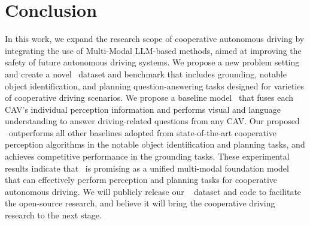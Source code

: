 \section{Conclusion}
In this work, we expand the research scope of cooperative autonomous driving by integrating the use of Multi-Modal LLM-based methods, aimed at improving the safety of future autonomous driving systems. We propose a new problem setting and create a novel \namedataset~dataset and benchmark that includes grounding, notable object identification, and planning question-answering tasks designed for varieties of cooperative driving scenarios. We propose a baseline model \namemethod~that fuses each CAV's individual perception information and performs visual and language understanding to answer driving-related questions from any CAV. 
Our proposed \namemethod~outperforms all other baselines adopted from state-of-the-art cooperative perception algorithms in the notable object identification and planning tasks, and achieves competitive performance in the grounding tasks. 
These experimental results indicate that \namemethod~is promising as a unified multi-modal foundation model that can effectively perform perception and planning tasks for cooperative autonomous driving.
We will publicly release our \namedataset~ dataset and code to facilitate the open-source research, and believe it will bring the cooperative driving research to the next stage.
\clearpage